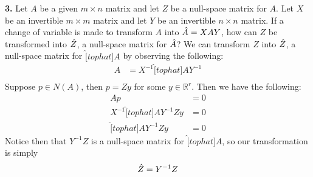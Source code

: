 \documentclass{article}
\begin{document}
    \textbf{3.} Let $A$ be a given $m \times n$ matrix and let $Z$ be a null-space matrix for $A$. Let $X$ be an invertible $m \times m$ matrix and let $Y$ be an invertible $n \times n$ matrix. If a change of variable is made to transform $A$ into $\Hat{A} = XAY$, how can $Z$ be transformed into $\Hat{Z}$, a null-space matrix for $\Hat{A}$?
    \newline\newline
    We can transform $Z$ into $\Hat{Z}$, a null-space matrix for $\hat[tophat]{A}$ by observing the following:
    \begin{align*}
        A &= X^{-1}\hat[tophat]{A}Y^{-1} \\
    \end{align*}
    Suppose $p \in N(A)$, then $p = Zy$ for some $y \in \mathbb{R}^r$. Then we have the following:
    \begin{align*}
        Ap &= 0 \\
        X^{-1}\hat[tophat]{A}Y^{-1}Zy &= 0\\
        \hat[tophat]{A}Y^{-1}Zy &= 0 
    \end{align*}
    Notice then that $Y^{-1}Z$ is a null-space matrix for $\hat[tophat]{A}$, so our transformation is simply
    \[\Hat{Z} = Y^{-1}Z\]

    
\end{document}

